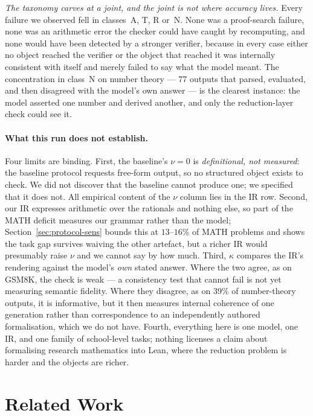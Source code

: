 \documentclass[11pt,a4paper]{article}
\begin{document}
\textit{The taxonomy carves at a joint, and the joint is not where accuracy
lives.}  Every failure we observed fell in classes~A, T, R or~N.  None was a
proof-search failure, none was an arithmetic error the checker could have caught
by recomputing, and none would have been detected by a stronger verifier,
because in every case either no object reached the verifier or the object that
reached it was internally consistent with itself and merely failed to say what
the model meant.  The concentration in class~N on number theory --- 77 outputs
that parsed, evaluated, and then disagreed with the model's own answer --- is
the clearest instance: the model asserted one number and derived another, and
only the reduction-layer check could see it.

\paragraph{What this run does not establish.}
Four limits are binding.  First, the baseline's $\nu = 0$ is
\emph{definitional, not measured}: the baseline protocol requests free-form
output, so no structured object exists to check.  We did not discover that the
baseline cannot produce one; we specified that it does not.  All empirical
content of the $\nu$ column lies in the IR row.  Second, our IR expresses
arithmetic over the rationals and nothing else, so part of the MATH deficit
measures our grammar rather than the model; Section~\ref{sec:protocol-sens}
bounds this at $13$--$16\%$ of MATH problems and shows the task gap survives
waiving the other artefact, but a richer IR would presumably raise $\nu$ and we
cannot say by how much.  Third, $\kappa$ compares the IR's rendering against the
model's \emph{own} stated answer.  Where the two agree, as on GSM8K, the check
is weak --- a consistency test that cannot fail is not yet measuring semantic
fidelity.  Where they disagree, as on 39\% of number-theory outputs, it is
informative, but it then measures internal coherence of one generation rather
than correspondence to an independently authored formalisation, which we do not
have.  Fourth, everything here is one model, one IR, and one family of
school-level tasks; nothing licenses a claim about formalising research
mathematics into Lean, where the reduction problem is harder and the objects are
richer.

\section{Related Work}
\label{sec:related}
\end{document}
